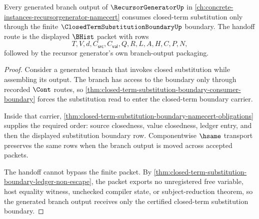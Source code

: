 \begin{theorem}
\label{thm:closed-term-substitution-boundary-recursor-handoff}
Every generated branch output of $\RecursorGeneratorUp$ in \autoref{ch:concrete-instances-recursorgenerator-namecert} consumes closed-term substitution only through the finite $\ClosedTermSubstitutionBoundaryUp$ boundary. The handoff route is the displayed $\BHist$ packet with rows
$$
T,V,d,C_{\mathsf{src}},C_{\mathsf{val}},Q,R,L,A,H,C,P,N,
$$
followed by the recursor generator's own branch-output packaging.
\end{theorem}
\begin{proof}
Consider a generated branch that invokes closed substitution while assembling its output. The branch has access to the boundary only through recorded $\Cont$ routes, so \autoref{thm:closed-term-substitution-boundary-consumer-boundary} forces the substitution read to enter the closed-term boundary carrier.

Inside that carrier, \autoref{thm:closed-term-substitution-boundary-namecert-obligations} supplies the required order: source closedness, value closedness, ledger entry, and then the displayed substitution boundary row. Componentwise $\hsame$ transport preserves the same rows when the branch output is moved across accepted packets.

The handoff cannot bypass the finite packet. By \autoref{thm:closed-term-substitution-boundary-ledger-non-escape}, the packet exports no unregistered free variable, host equality witness, unchecked compiler state, or subject-reduction theorem, so the generated branch output receives only the certified closed-term substitution boundary.
\end{proof}

